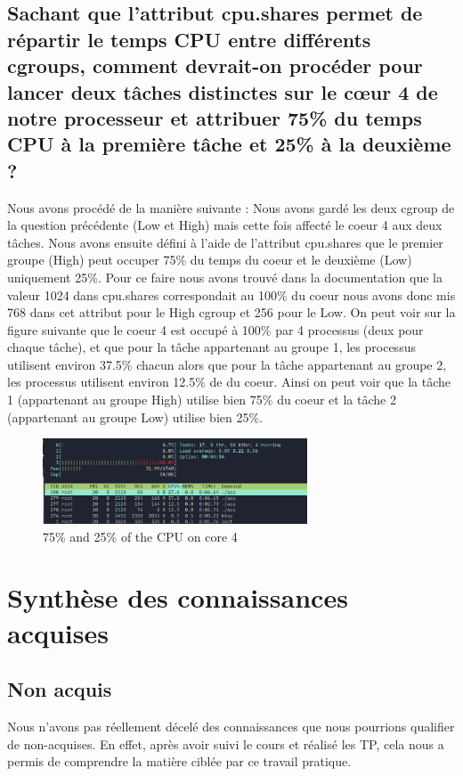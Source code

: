\documentclass{ReportTemplate}
\begin{document}
\subsection{Sachant que l’attribut cpu.shares permet de répartir le temps CPU entre différents cgroups, comment devrait-on procéder pour lancer deux tâches distinctes sur le cœur 4 de notre processeur et attribuer 75\% du temps CPU à la première tâche et 25\% à la deuxième ?}
Nous avons procédé de la manière suivante : \newline
Nous avons gardé les deux cgroup de la question précédente (Low et High) mais
cette fois affecté le coeur 4 aux deux tâches. Nous avons ensuite défini à
l'aide de l'attribut cpu.shares que le premier groupe (High) peut occuper 75\% du temps
du coeur et le deuxième (Low) uniquement 25\%.
Pour ce faire nous avons trouvé dans la documentation que la valeur 1024 dans
cpu.shares correspondait au 100\% du coeur nous avons donc mis 768 dans cet
attribut pour le High cgroup et 256 pour le Low. On peut voir sur la figure
suivante que le coeur 4 est occupé à 100\% par 4 processus (deux pour chaque
tâche), et que pour la tâche appartenant au groupe 1, les processus utilisent
environ 37.5\% chacun alors que pour la tâche appartenant au groupe 2, les
processus utilisent environ 12.5\% de du coeur. Ainsi on peut voir que la tâche
1 (appartenant au groupe High) utilise bien 75\% du coeur et la tâche 2
(appartenant au groupe Low) utilise bien 25\%.
\begin{figure}[H]
    \centering
    \includegraphics[width=0.7\textwidth]{imageSources/75x25Use.png}
    \caption{75\% and 25\% of the CPU on core 4}
    \label{fig:LowHighGroup2}
\end{figure}
\newpage
\section{Synthèse des connaissances acquises}
\subsection{Non acquis}
Nous n'avons pas réellement décelé des connaissances que nous pourrions
qualifier de non-acquises. En effet, après avoir suivi le cours et réalisé les
TP, cela nous a permis de comprendre la matière ciblée par ce travail pratique.
\end{document}
